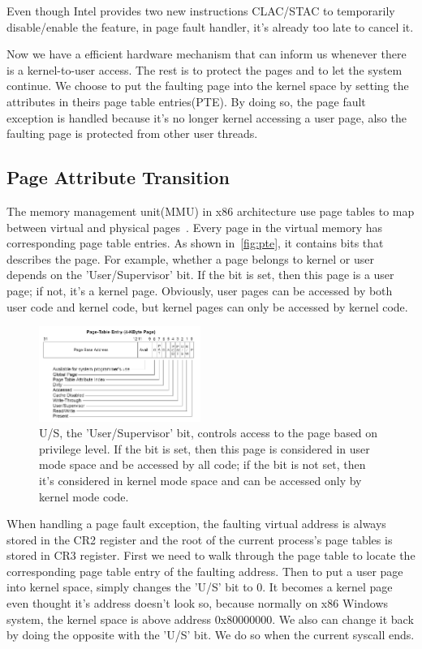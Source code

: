 Even though Intel provides two new instructions CLAC/STAC to temporarily disable/enable the feature, in page fault handler, it's already too late to cancel it.

Now we have a efficient hardware mechanism that can inform us whenever there is a kernel-to-user access. The rest is to protect the pages and to let the system continue. We choose to put the faulting page into the kernel space by setting the attributes in theirs page table entries(PTE). By doing so, the page fault exception is handled because it's no longer kernel accessing a user page, also the faulting page is protected from other user threads. 

\subsection{Page Attribute Transition} %


The memory management unit(MMU) in x86 architecture use page tables to map between virtual and physical pages~\cite{intelpaging}. Every page in the virtual memory has corresponding page table entries. As shown in~\autoref{fig:pte}, it contains bits that describes the page. For example, whether a page belongs to kernel or user depends on the 'User/Supervisor' bit. If the bit is set, then this page is a user page; if not, it's a kernel page. Obviously, user pages can be accessed by both user code and kernel code, but kernel pages can only be accessed by kernel code. 

\begin{figure}[th]
  \includegraphics[width=0.47\textwidth]{figures/pte}
  \centering
  \caption{U/S, the 'User/Supervisor' bit, controls access to the page based on privilege level. If the bit is set, then this page is considered in user mode space and be accessed by all code; if the bit is not set, then it's considered in kernel mode space and can be accessed only by kernel mode code. }
  \label{fig:pte}
\end{figure}


When handling a page fault exception, the faulting virtual address is always stored in the CR2 register and the root of the current process's page tables is stored in CR3 register. First we need to walk through the page table to locate the corresponding page table entry of the faulting address. Then to put a user page into kernel space, simply changes the 'U/S' bit to 0. It becomes a kernel page even thought it's address doesn't look so, because normally on x86 Windows system, the kernel space is above address 0x80000000. We also can change it back by doing the opposite with the 'U/S' bit. We do so when the current syscall ends.

